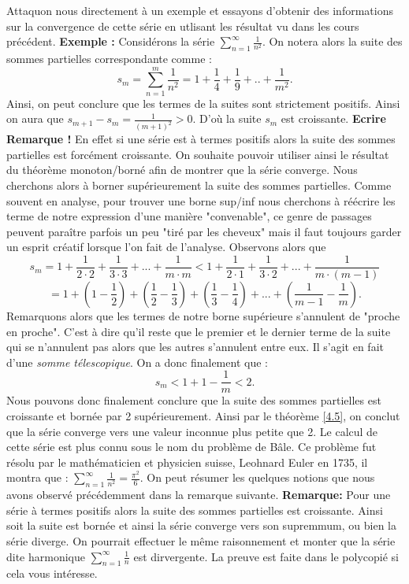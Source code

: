 \documentclass[a4paper, 12pt, french, twoside]{article}
\begin{document}
Attaquon nous directement à un exemple et essayons d'obtenir des informations sur la convergence de cette série en utlisant les résultat vu dans les cours précédent. \newline
\textbf{Exemple :} Considérons la série $\sum_{n=1}^{\infty} \frac{1}{n^2}$. On notera alors la suite des sommes partielles correspondante comme : $$ s_m = \sum_{n=1}^{m} \frac{1}{n^2} = 1 +  \frac{1}{4} + \frac{1}{9} + .. + \frac{1}{m^2}.$$
Ainsi, on peut conclure que les termes de la suites sont strictement positifs. Ainsi on aura que $s_{m+1} - s_m = \frac{1}{(m+1)^2} > 0$. D'où la suite $s_m$ est croissante. \textbf{Ecrire Remarque ! }En effet si une série est à termes positifs alors la suite des sommes partielles est forcément croissante. On souhaite pouvoir utiliser ainsi le résultat du théorème monoton/borné afin de montrer que la série converge. Nous cherchons alors à borner supérieurement la suite des sommes partielles. Comme souvent en analyse, pour trouver une borne sup/inf nous cherchons à réécrire les terme de notre expression d'une manière "convenable", ce genre de passages peuvent paraître parfois un peu "tiré par les cheveux" mais il faut toujours garder un esprit créatif lorsque l'on fait de l'analyse. Observons alors que $$ s_m = 1 + \frac{1}{2\cdot2} + \frac{1}{3\cdot3} + ... + \frac{1}{m \cdot m} < 1 + \frac{1}{2\cdot1 } + \frac{1}{3\cdot2} + ... + \frac{1}{m \cdot (m-1)}$$
$$= 1 + \left ( 1 - \frac{1}{2} \right ) + \left ( \frac{1}{2} - \frac{1}{3} \right ) + \left ( \frac{1}{3} - \frac{1}{4} \right ) + ... + \left ( \frac{1}{m-1} - \frac{1}{m} \right ) .$$
Remarquons alors que les termes de notre borne supérieure s'annulent de "proche en proche". C'est à dire qu'il reste que le premier et le dernier terme de la suite qui se n'annulent pas alors que les autres s'annulent entre eux. Il s'agit en fait d'une \textit{somme télescopique}. On a donc finalement que : 
$$ s_m < 1+1-\frac{1}{m} < 2. $$ Nous pouvons donc finalement conclure que la suite des sommes partielles est croissante et bornée par 2 supérieurement. Ainsi par le théorème \ref{4.5}, on conclut que la série converge vers une valeur inconnue plus petite que 2. Le calcul de cette série est plus connu sous le nom du problème de Bâle. Ce problème fut résolu par le mathématicien et physicien suisse, Leohnard Euler en 1735, il montra que : $\sum_{n=1}^{\infty} \frac{1}{n^2} = \frac{\pi^2}{6}$. 
\newline 
On peut résumer les quelques notions que nous avons observé précédemment dans la remarque suivante. \newline 
\textbf{Remarque:}  
 Pour une série à termes positifs alors la suite des sommes partielles est croissante. Ainsi soit la suite est bornée et ainsi la série converge vers son supremmum, ou bien la série diverge. \newline 
On pourrait effectuer le même raisonnement et monter que la série dite harmonique $\sum_{n=1}^{\infty} \frac{1}{n}$ est dirvergente. La preuve est faite dans le polycopié si cela vous intéresse.
 \newline
\end{document}
